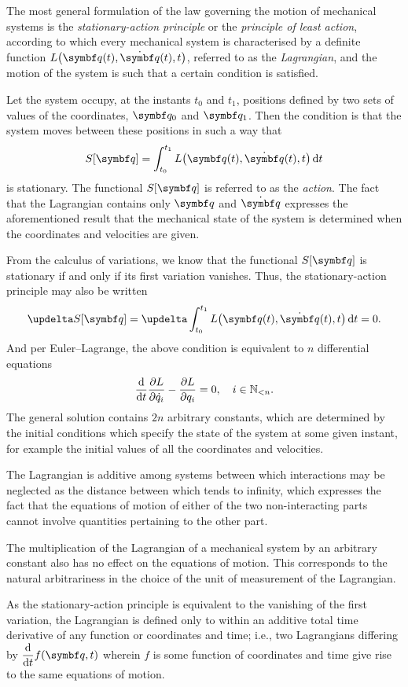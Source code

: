 The most general formulation of the law governing the motion of mechanical systems is the \emph{stationary-action
principle} or the \emph{principle of least action}, according to which every mechanical system is characterised by a
definite function \(L\big(\vct{q}(t), \dot{\vct{q}}(t), t\big)\), referred to as the \emph{Lagrangian}, and the motion of the
system is such that a certain condition is satisfied.

Let the system occupy, at the instants \(t_0\) and \(t_1\), positions defined by two sets of values of the coordinates,
\(\vct{q}_0\) and \(\vct{q}_1\). Then the condition is that the system moves between these positions in such a way that
\[
  S[\vct{q}] = \int_{t_0}^{t_1} L\big(\vct{q}(t), \dot{\vct{q}}(t), t\big) \diff t
\]
is stationary. The functional \(S[\vct{q}]\) is referred to as the \emph{action}. The fact that the Lagrangian contains
only \(\vct{q}\) and \(\dot{\vct{q}}\) expresses the aforementioned result that the mechanical state of the system is
determined when the coordinates and velocities are given.

From the calculus of variations, we know that the functional \(S[\vct{q}]\) is stationary if and only if its first
variation vanishes. Thus, the stationary-action principle may also be written
\[
  \updelta S[\vct{q}] = \updelta \int_{t_0}^{t_1} L\big(\vct{q}(t), \dot{\vct{q}}(t), t\big) \diff t = 0.
\]
And per Euler--Lagrange, the above condition is equivalent to \(n\) differential equations
\[
  \frac{\mathop{}\!\mathrm{d}}{\mathop{}\!\mathrm{d} t} \frac{\partial L}{\partial \dot{q}_i} - \frac{\partial L}{\partial q_i} = 0, \quad i \in \mathbb{N}_{<n}.
\]
The general solution contains \(2 n\) arbitrary constants, which are determined by the initial conditions which specify
the state of the system at some given instant, for example the initial values of all the coordinates and velocities.

The Lagrangian is additive among systems between which interactions may be neglected as the distance between which tends
to infinity, which expresses the fact that the equations of motion of either of the two non-interacting parts cannot
involve quantities pertaining to the other part.

The multiplication of the Lagrangian of a mechanical system by an arbitrary constant also has no effect on the equations
of motion. This corresponds to the natural arbitrariness in the choice of the unit of measurement of the Lagrangian.

As the stationary-action principle is equivalent to the vanishing of the first variation, the Lagrangian is defined only
to within an additive total time derivative of any function or coordinates and time; i.e., two Lagrangians differing by
\(\dis \frac{\diff}{\diff t} f(\vct{q}, t)\) wherein \(f\) is some function of coordinates and time give rise to the
same equations of motion.


